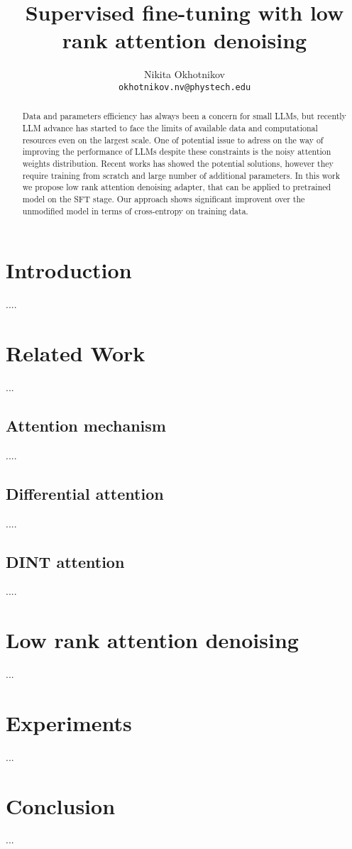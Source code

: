 \documentclass{article}
\title{Supervised fine-tuning with low rank attention denoising}
\author{Nikita Okhotnikov\\
	\texttt{okhotnikov.nv@phystech.edu} \\
}
\date{}
\begin{document}
\maketitle
\begin{abstract}
    Data and parameters efficiency has always been a concern for small LLMs, but recently LLM advance has started to face the limits of available data and computational resources even on the largest scale. One of potential issue to adress on the way of improving the performance of LLMs despite these constraints is the noisy attention weights distribution. Recent works has showed the potential solutions, however they require training from scratch and large number of additional parameters. In this work we propose low rank attention denoising adapter, that can be applied to pretrained model on the SFT stage. Our approach shows significant improvent over the unmodified model in terms of cross-entropy on training data.
\end{abstract}

\section{Introduction}
    ....

\section{Related Work}
    ...
\subsection{Attention mechanism}
    ....
\subsection{Differential attention}
    ....
\subsection{DINT attention}
    ....
    

\section{Low rank attention denoising}

    ...

\section{Experiments}
    ... 
\section{Conclusion}

    ...





\end{document}
